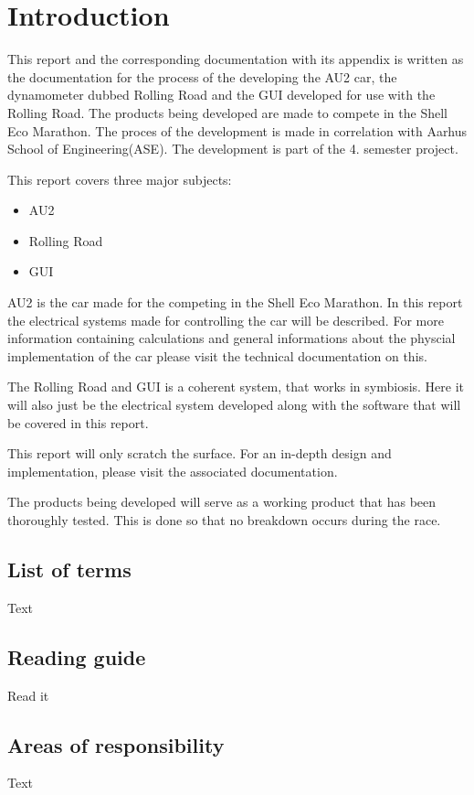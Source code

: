 \chapter{Introduction}
This report and the corresponding documentation with its appendix is written as the documentation for the process of the developing the AU2 car, the dynamometer dubbed Rolling Road and the GUI developed for use with the Rolling Road. The products being developed are made to compete in the Shell Eco Marathon. The proces of the development is made in correlation with Aarhus School of Engineering(ASE). The development is part of the 4. semester project. 

This report covers three major subjects:

\begin{itemize}
	\item{AU2}
	\item{Rolling Road}
	\item{GUI}
\end{itemize}

AU2 is the car made for the competing in the Shell Eco Marathon. In this report the electrical systems made for controlling the car will be described. For more information containing calculations and general informations about the physcial implementation of the car please visit the technical documentation on this.

The Rolling Road and GUI is a coherent system, that works in symbiosis. Here it will also just be the electrical system developed along with the software that will be covered in this report. 

This report will only scratch the surface. For an in-depth design and implementation, please visit the associated documentation. 

The products being developed will serve as a working product that has been thoroughly tested. This is done so that no breakdown occurs during the race. 

\section{List of terms}
Text

\section{Reading guide}
Read it

\section{Areas of responsibility}
Text

